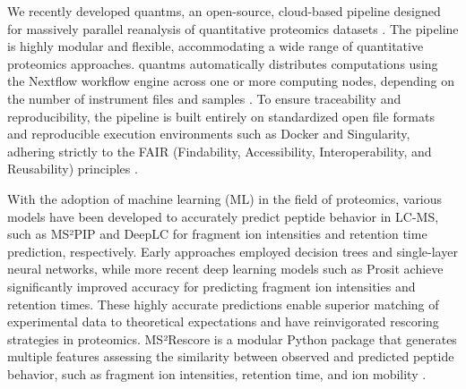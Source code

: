 \documentclass[12pt]{article}
\begin{document}
We recently developed quantms, an open-source, cloud-based pipeline designed for massively parallel reanalysis of quantitative proteomics datasets \cite{dai_quantms_2024}. The pipeline is highly modular and flexible, accommodating a wide range of quantitative proteomics approaches. quantms automatically distributes computations using the Nextflow workflow engine across one or more computing nodes, depending on the number of instrument files and samples \cite{di_tommaso_nextflow_2017}. To ensure traceability and reproducibility, the pipeline is built entirely on standardized open file formats \cite{dai_proteomics_2021} \cite{martens_mzmlcommunity_2011} and reproducible execution environments such as Docker and Singularity, adhering strictly to the FAIR (Findability, Accessibility, Interoperability, and Reusability) principles \cite{wilkinson_fair_2016}. %

With the adoption of machine learning (ML) in the field of proteomics, various models have been developed to accurately predict peptide behavior in LC-MS, such as MS²PIP \cite{degroeve_ms2pip_2013} and DeepLC \cite{bouwmeester_deeplc_2021} for fragment ion intensities and retention time prediction, respectively. %
Early approaches employed decision trees and single-layer neural networks, while more recent deep learning models such as Prosit \cite{gessulat_prosit_2019} achieve significantly improved accuracy for predicting fragment ion intensities and retention times. These highly accurate predictions enable superior matching of experimental data to theoretical expectations and have reinvigorated rescoring strategies in proteomics. %
MS²Rescore is a modular Python package that generates multiple features assessing the similarity between observed and predicted peptide behavior, such as fragment ion intensities, retention time, and ion mobility \cite{buur_ms2_2024}. %
\end{document}
